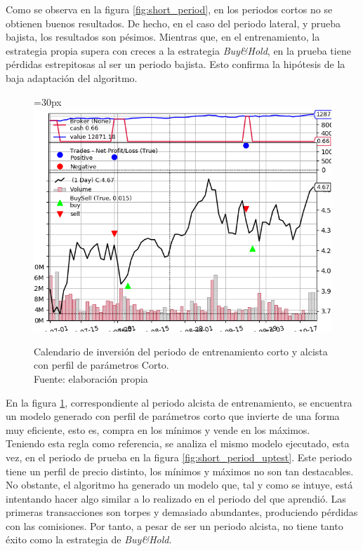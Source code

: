 Como se observa en la figura \ref{fig:short_period}, en los periodos cortos no se obtienen buenos resultados. De hecho, en el caso del periodo lateral, y prueba bajista, los resultados son p\'esimos. Mientras que, en el entrenamiento, la estrategia propia supera con creces a la estrategia \textit{Buy\&Hold}, en la prueba tiene p\'erdidas estrepitosas al ser un periodo bajista. Esto confirma la hip\'otesis de la baja adaptaci\'on del algoritmo.\\

     	\begin{figure}[H]
     		\centering\leftskip=30px
     		\includegraphics[scale=0.70]{imagenes/S_Short_train.png}
     		\caption[Calendario de inversi\'on del periodo de entrenamiento corto alcista.]{Calendario de inversi\'on del periodo de entrenamiento corto y alcista con perfil de par\'ametros Corto.\\ Fuente: elaboraci\'on propia}
     		\label{fig:short_period_uptrain}
     	\end{figure}
     	
En la figura \ref{fig:short_period_uptrain}, correspondiente al periodo alcista de entrenamiento, se encuentra un modelo generado con perfil de par\'ametros corto que invierte de una forma muy eficiente, esto es, compra en los m\'inimos y vende en los m\'aximos. \\

Teniendo esta regla como referencia, se analiza el mismo modelo ejecutado, esta vez, en el periodo de prueba en la figura \ref{fig:short_period_uptest}. Este periodo tiene un perfil de precio distinto, los m\'inimos y m\'aximos no son tan destacables. No obstante, el algoritmo ha generado un modelo que, tal y como se intuye, est\'a intentando hacer algo similar a lo realizado en el periodo del que aprendi\'o. Las primeras transacciones son torpes y demasiado abundantes, produciendo p\'erdidas con las comisiones.	Por tanto, a pesar de ser un periodo alcista, no tiene tanto \'exito como la estrategia de \textit{Buy\&Hold}.\\
     	
